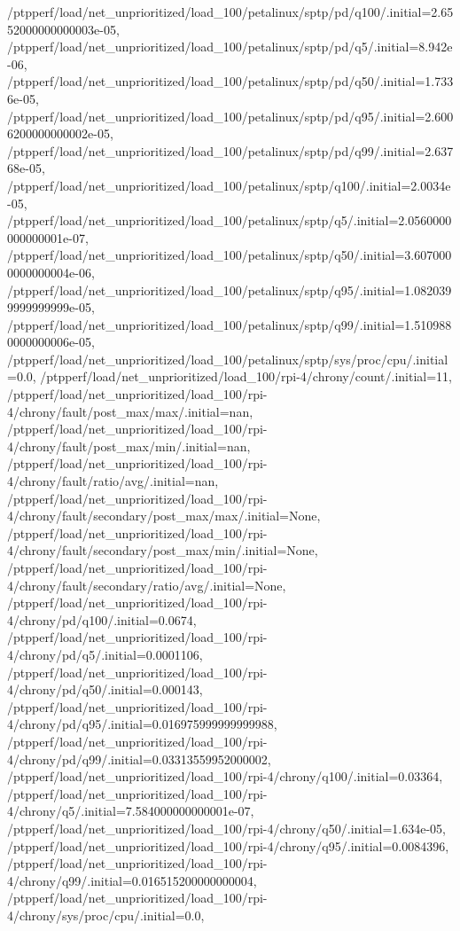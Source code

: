 {    /ptpperf/load/net_unprioritized/load_100/petalinux/sptp/pd/q100/.initial=2.6552000000000003e-05,
    /ptpperf/load/net_unprioritized/load_100/petalinux/sptp/pd/q5/.initial=8.942e-06,
    /ptpperf/load/net_unprioritized/load_100/petalinux/sptp/pd/q50/.initial=1.7336e-05,
    /ptpperf/load/net_unprioritized/load_100/petalinux/sptp/pd/q95/.initial=2.6006200000000002e-05,
    /ptpperf/load/net_unprioritized/load_100/petalinux/sptp/pd/q99/.initial=2.63768e-05,
    /ptpperf/load/net_unprioritized/load_100/petalinux/sptp/q100/.initial=2.0034e-05,
    /ptpperf/load/net_unprioritized/load_100/petalinux/sptp/q5/.initial=2.0560000000000001e-07,
    /ptpperf/load/net_unprioritized/load_100/petalinux/sptp/q50/.initial=3.6070000000000004e-06,
    /ptpperf/load/net_unprioritized/load_100/petalinux/sptp/q95/.initial=1.0820399999999999e-05,
    /ptpperf/load/net_unprioritized/load_100/petalinux/sptp/q99/.initial=1.5109880000000006e-05,
    /ptpperf/load/net_unprioritized/load_100/petalinux/sptp/sys/proc/cpu/.initial=0.0,
    /ptpperf/load/net_unprioritized/load_100/rpi-4/chrony/count/.initial=11,
    /ptpperf/load/net_unprioritized/load_100/rpi-4/chrony/fault/post_max/max/.initial=nan,
    /ptpperf/load/net_unprioritized/load_100/rpi-4/chrony/fault/post_max/min/.initial=nan,
    /ptpperf/load/net_unprioritized/load_100/rpi-4/chrony/fault/ratio/avg/.initial=nan,
    /ptpperf/load/net_unprioritized/load_100/rpi-4/chrony/fault/secondary/post_max/max/.initial=None,
    /ptpperf/load/net_unprioritized/load_100/rpi-4/chrony/fault/secondary/post_max/min/.initial=None,
    /ptpperf/load/net_unprioritized/load_100/rpi-4/chrony/fault/secondary/ratio/avg/.initial=None,
    /ptpperf/load/net_unprioritized/load_100/rpi-4/chrony/pd/q100/.initial=0.0674,
    /ptpperf/load/net_unprioritized/load_100/rpi-4/chrony/pd/q5/.initial=0.0001106,
    /ptpperf/load/net_unprioritized/load_100/rpi-4/chrony/pd/q50/.initial=0.000143,
    /ptpperf/load/net_unprioritized/load_100/rpi-4/chrony/pd/q95/.initial=0.016975999999999988,
    /ptpperf/load/net_unprioritized/load_100/rpi-4/chrony/pd/q99/.initial=0.03313559952000002,
    /ptpperf/load/net_unprioritized/load_100/rpi-4/chrony/q100/.initial=0.03364,
    /ptpperf/load/net_unprioritized/load_100/rpi-4/chrony/q5/.initial=7.584000000000001e-07,
    /ptpperf/load/net_unprioritized/load_100/rpi-4/chrony/q50/.initial=1.634e-05,
    /ptpperf/load/net_unprioritized/load_100/rpi-4/chrony/q95/.initial=0.0084396,
    /ptpperf/load/net_unprioritized/load_100/rpi-4/chrony/q99/.initial=0.016515200000000004,
    /ptpperf/load/net_unprioritized/load_100/rpi-4/chrony/sys/proc/cpu/.initial=0.0,
}
